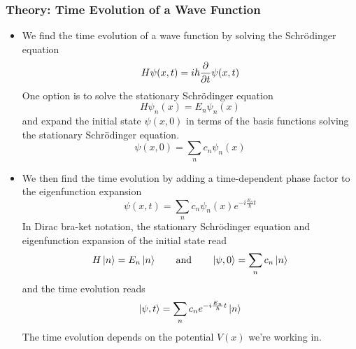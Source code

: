 \documentclass[11pt, a4paper]{article}
\newcommand{\eqtext}[1]{\qquad \text{#1} \qquad}
\newcommand{\schro}{Schr\"{o}dinger\xspace}
\begin{document}
\subsubsection{Theory: Time Evolution of a Wave Function}
\begin{itemize}
	\item We find the time evolution of a wave function by solving the \schro equation
	\begin{equation*}
		H\psi(x, t) = i\hbar \pdv{t}\psi(x, t)
	\end{equation*}
	One option is to solve the stationary \schro equation
	\begin{equation*}
		H \psi_{n}(x) = E_{n}\psi_{n}(x)
	\end{equation*}
	and expand the initial state $ \psi(x, 0) $ in terms of the basis functions solving the stationary \schro equation.
	\begin{equation*}
		\psi(x, 0) = \sum_{n}c_{n}\psi_{n}(x)
	\end{equation*}
	\item We then find the time evolution by adding a time-dependent phase factor to the eigenfunction expansion
	\begin{equation*}
		\psi(x, t) = \sum_{n}c_{n}\psi_{n}(x)e^{-i\frac{E_{n}}{\hbar}t}
	\end{equation*}
	In Dirac bra-ket notation, the stationary \schro equation and eigenfunction expansion of the initial state read
	\begin{equation*}
		H\ket{n} = E_{n}\ket{n} \eqtext{and} \ket{\psi, 0} = \sum_{n}c_{n}\ket{n} 
	\end{equation*}
	and the time evolution reads
	\begin{equation*}
		\ket{\psi, t} = \sum_{n}c_{n} e^{-i\frac{E_{n}}{\hbar}t} \ket{n}
	\end{equation*}
	The time evolution depends on the potential $ V(x) $ we're working in.
\end{itemize}
\end{document}
